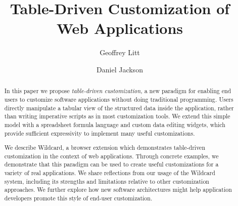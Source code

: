 \documentclass[sigplan,10pt,anonymous,review]{acmart}
\begin{document}
\title{Table-Driven Customization of Web Applications}


\author{Geoffrey Litt}

\author{Daniel Jackson}


\begin{abstract}
  In this paper we propose \emph{table-driven customization,} a new
  paradigm for enabling end users to customize software applications
  without doing traditional programming\emph{.} Users directly
  manipulate a tabular view of the structured data inside the
  application, rather than writing imperative scripts as in most
  customization tools. We extend this simple model with a spreadsheet
  formula language and custom data editing widgets, which provide
  sufficient expressivity to implement many useful customizations.

  We describe Wildcard, a browser extension which demonstrates
  table-driven customization in the context of web applications. Through
  concrete examples, we demonstrate that this paradigm can be used to
  create useful customizations for a variety of real applications. We
  share reflections from our usage of the Wildcard system, including its
  strengths and limitations relative to other customization approaches.
  We further explore how new software architectures might help
  application developers promote this style of end-user customization.
\end{abstract}
\end{document}

